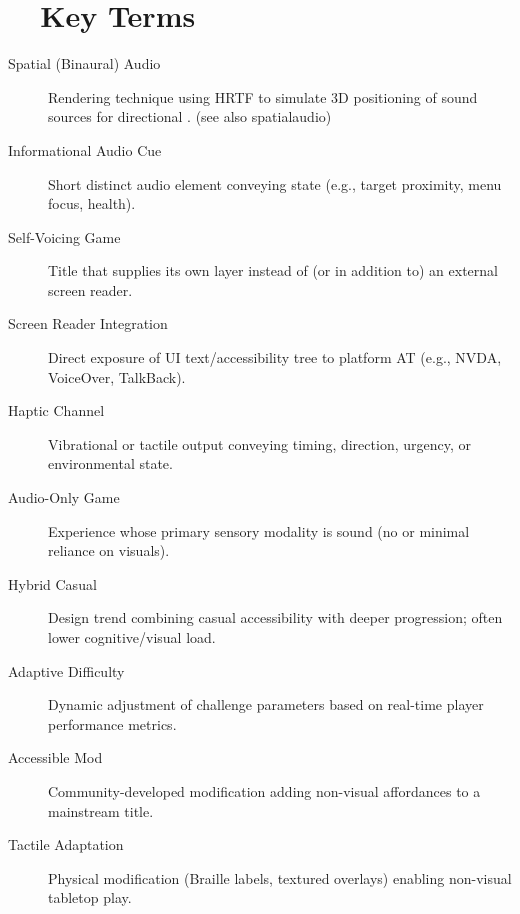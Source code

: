 \section{~~Key Terms}
\label{sec:gaming-key-terms}
\begin{description}
	\item[Spatial (Binaural) Audio]  Rendering technique using HRTF to simulate 3D positioning of sound sources for directional . (see also \gls{spatialaudio})
	\item[Informational Audio Cue]  Short distinct audio element conveying state (e.g., target proximity, menu focus, health).
	\item[Self-Voicing Game]  Title that supplies its own  layer instead of (or in addition to) an external screen reader.
	\item[Screen Reader Integration]  Direct exposure of UI text/accessibility tree to platform AT (e.g., NVDA, VoiceOver, TalkBack).
	\item[Haptic Channel]  Vibrational or tactile output conveying timing, direction, urgency, or environmental state.
	\item[Audio-Only Game]  Experience whose primary sensory modality is sound (no or minimal reliance on visuals).
	\item[Hybrid Casual]  Design trend combining casual accessibility with deeper progression; often lower cognitive/visual load.
	\item[Adaptive Difficulty]  Dynamic adjustment of challenge parameters based on real-time player performance metrics.
	\item[Accessible Mod]  Community-developed modification adding non-visual affordances to a mainstream title.
	\item[Tactile Adaptation]  Physical modification (Braille labels, textured overlays) enabling non-visual tabletop play.
\end{description}

